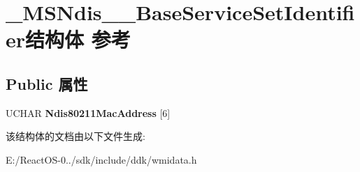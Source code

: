 \hypertarget{struct___m_s_ndis__80211___base_service_set_identifier}{}\section{\+\_\+\+M\+S\+Ndis\+\_\+\_\+\+Base\+Service\+Set\+Identifier结构体 参考}
\label{struct___m_s_ndis__80211___base_service_set_identifier}
\subsection*{Public 属性}
\begin{DoxyCompactItemize}
\item 
\mbox{\label{struct___m_s_ndis__80211___base_service_set_identifier_a5ae89fda8807fa0ef686903526988265}} 
U\+C\+H\+AR {\bfseries Ndis80211\+Mac\+Address} \mbox{[}6\mbox{]}
\end{DoxyCompactItemize}


该结构体的文档由以下文件生成\+:\begin{DoxyCompactItemize}
\item 
E\+:/\+React\+O\+S-\/0../sdk/include/ddk/wmidata.\+h\end{DoxyCompactItemize}
